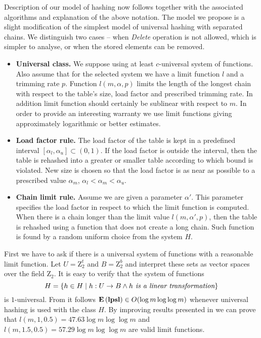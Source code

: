 Description of our model of hashing now follows together with the associated algorithms and explanation of the above notation. The model we propose is a slight modification of the simplest model of universal hashing with separated chains. We distinguish two cases -- when \emph{Delete} operation is not allowed, which is simpler to analyse, or when the stored elements can be removed.

\begin{itemize}
\item \textbf{Universal class.} We suppose using at least $c$-universal system of functions. Also assume that for the selected system we have a limit function $l$ and a trimming rate $p$. Function $l(m, \alpha, p)$ limits the length of the longest chain with respect to the table's size, load factor and prescribed trimming rate. In addition limit function should certainly be sublinear with respect to $m$. In order to provide an interesting warranty we use limit functions giving approximately logarithmic or better estimates.

\item \textbf{Load factor rule.} The load factor of the table is kept in a predefined interval $[\alpha_l, \alpha_u] \subset (0, 1)$. If the load factor is outside the interval, then the table is rehashed into a greater or smaller table according to which bound is violated. New size is chosen so that the load factor is as near as possible to a prescribed value $\alpha_m$, $\alpha_l < \alpha_m < \alpha_u$. 

\item \textbf{Chain limit rule.} Assume we are given a parameter $\alpha'$. This parameter specifies the load factor in respect to which the limit function is computed. When there is a chain longer than the limit value $l(m, \alpha', p)$, then the table is rehashed using a function that does not create a long chain. Such function is found by a random uniform choice from the system $H$.
\end{itemize}



First we have to ask if there is a universal system of functions with a reasonable limit function. Let $U = \mathrm{Z}_2^t$ and $B = \mathrm{Z}_2^b$ and interpret these sets as vector spaces over the field $\mathrm{Z_2}$. It is easy to verify that the system of functions \[ H = \{h \in H \mid h: U \rightarrow B \wedge h \textit{ is a linear transformation}\} \] is $1$-universal. From \cite{DBLP:journals/jacm/AlonDMPT99} it follows $\mathbf{E}\left(\mathbf{lpsl}\right) \in O(\log m \log \log m)$ whenever universal hashing is used with the class $H$. By improving results presented in \cite{DBLP:journals/jacm/AlonDMPT99} we can prove that $l(m, 1, 0.5) = 47.63 \log m \log \log m$ and $l(m, 1.5, 0.5) = 57.29 \log m \log \log m$ are valid limit functions.

